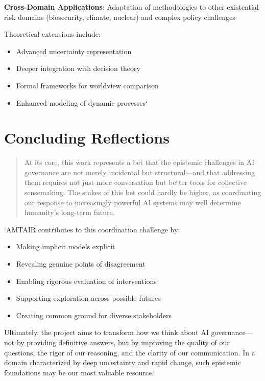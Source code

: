 \documentclass[
  11pt,
  letterpaper,
]{book}
\providecommand{\tightlist}{%
  \setlength{\itemsep}{0pt}\setlength{\parskip}{0pt}}
\begin{document}
\textbf{Cross-Domain Applications}: Adaptation of methodologies to other
existential risk domains (biosecurity, climate, nuclear) and complex
policy challenges

Theoretical extensions include:

\begin{itemize}
\tightlist
\item
  Advanced uncertainty representation
\item
  Deeper integration with decision theory
\item
  Formal frameworks for worldview comparison
\item
  Enhanced modeling of dynamic processes`
\end{itemize}

\section{Concluding Reflections}\label{sec-concluding-reflections}

\begin{quote}
At its core, this work represents a bet that the epistemic challenges in
AI governance are not merely incidental but structural---and that
addressing them requires not just more conversation but better tools for
collective sensemaking. The stakes of this bet could hardly be higher,
as coordinating our response to increasingly powerful AI systems may
well determine humanity's long-term future.
\end{quote}

`AMTAIR contributes to this coordination challenge by:

\begin{itemize}
\tightlist
\item
  Making implicit models explicit
\item
  Revealing genuine points of disagreement
\item
  Enabling rigorous evaluation of interventions
\item
  Supporting exploration across possible futures
\item
  Creating common ground for diverse stakeholders
\end{itemize}

Ultimately, the project aims to transform how we think about AI
governance---not by providing definitive answers, but by improving the
quality of our questions, the rigor of our reasoning, and the clarity of
our communication. In a domain characterized by deep uncertainty and
rapid change, such epistemic foundations may be our most valuable
resource.`
\end{document}
